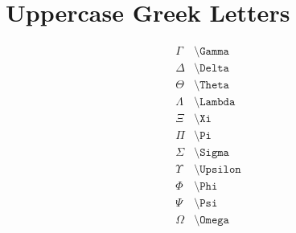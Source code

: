 \documentclass{article}
\begin{document}
\section*{Uppercase Greek Letters}

\[
\begin{array}{ll}
\Gamma & \texttt{\textbackslash Gamma} \\
\Delta & \texttt{\textbackslash Delta} \\
\Theta & \texttt{\textbackslash Theta} \\
\Lambda & \texttt{\textbackslash Lambda} \\
\Xi & \texttt{\textbackslash Xi} \\
\Pi & \texttt{\textbackslash Pi} \\
\Sigma & \texttt{\textbackslash Sigma} \\
\Upsilon & \texttt{\textbackslash Upsilon} \\
\Phi & \texttt{\textbackslash Phi} \\
\Psi & \texttt{\textbackslash Psi} \\
\Omega & \texttt{\textbackslash Omega}
\end{array}
\]
\end{document}
